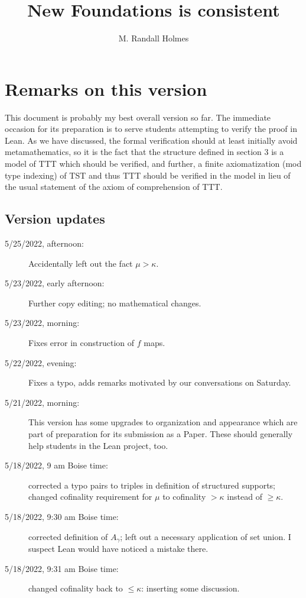 \documentclass[112pt]{article}
\title{New Foundations is consistent}
\author{M. Randall Holmes}
\begin{document}
\maketitle

\tableofcontents

\newpage


\newpage

\section{Remarks on this version}

This document is probably my best overall version so far.  The immediate occasion for its preparation is to serve students attempting to verify the proof in Lean.  As we have discussed, the formal verification should at least initially avoid metamathematics, so it is the fact that the structure defined in section 3 is a model of TTT which should be verified, and further, a finite axiomatization (mod type indexing) of TST and thus TTT should be verified in the model in lieu of the usual statement of the axiom of comprehension of TTT.

\subsection{Version updates}

\begin{description}

\item[5/25/2022, afternoon:]  Accidentally left out the fact $\mu>\kappa$.

\item[5/23/2022, early afternoon:]  Further copy editing;  no mathematical changes.

\item[5/23/2022, morning:]  Fixes error in construction of $f$ maps.

\item[5/22/2022, evening:]  Fixes a typo, adds remarks motivated by our conversations on Saturday.

\item[5/21/2022, morning:]  This version has some upgrades to organization and appearance which are part of preparation for its submission as a Paper.  These should generally help students in the Lean project, too.

\item[5/18/2022, 9 am Boise time:]  corrected a typo pairs to triples in definition of structured supports;  changed cofinality requirement for
$\mu$ to cofinality $>\kappa$ instead of $\geq \kappa$.

\item[5/18/2022, 9:30 am Boise time:]  corrected definition of $A_\gamma$;  left out a necessary application of set union.  I suspect Lean would have noticed a mistake there.

\item[5/18/2022, 9:31 am Boise time:]  changed cofinality back to $\leq \kappa$:  inserting some discussion.

\end{description}
\end{document}

